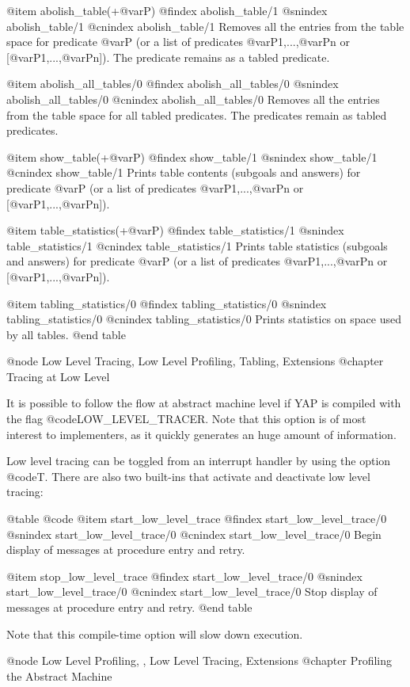 {{{{{{{{@item abolish_table(+@var{P})
@findex abolish_table/1
@snindex abolish_table/1
@cnindex abolish_table/1
Removes all the entries from the table space for predicate @var{P} (or
a list of predicates @var{P1},...,@var{Pn} or
[@var{P1},...,@var{Pn}]). The predicate remains as a tabled predicate.

@item abolish_all_tables/0
@findex abolish_all_tables/0
@snindex abolish_all_tables/0
@cnindex abolish_all_tables/0
Removes all the entries from the table space for all tabled
predicates. The predicates remain as tabled predicates.

@item show_table(+@var{P})
@findex show_table/1
@snindex show_table/1
@cnindex show_table/1
Prints table contents (subgoals and answers) for predicate @var{P}
(or a list of predicates @var{P1},...,@var{Pn} or
[@var{P1},...,@var{Pn}]).

@item table_statistics(+@var{P})
@findex table_statistics/1
@snindex table_statistics/1
@cnindex table_statistics/1
Prints table statistics (subgoals and answers) for predicate @var{P}
(or a list of predicates @var{P1},...,@var{Pn} or
[@var{P1},...,@var{Pn}]).

@item tabling_statistics/0
@findex tabling_statistics/0
@snindex tabling_statistics/0
@cnindex tabling_statistics/0
Prints statistics on space used by all tables.
@end table


@node Low Level Tracing, Low Level Profiling, Tabling, Extensions
@chapter Tracing at Low Level

It is possible to follow the flow at abstract machine level if
YAP is compiled with the flag @code{LOW_LEVEL_TRACER}. Note
that this option is of most interest to implementers, as it quickly generates
an huge amount of information.

Low level tracing can be toggled from an interrupt handler by using the
option @code{T}. There are also two built-ins that activate and
deactivate low level tracing:

@table @code
@item start_low_level_trace
@findex start_low_level_trace/0
@snindex start_low_level_trace/0
@cnindex start_low_level_trace/0
Begin display of messages at procedure entry and retry.

@item stop_low_level_trace
@findex start_low_level_trace/0
@snindex start_low_level_trace/0
@cnindex start_low_level_trace/0
Stop display of messages at procedure entry and retry.
@end table

Note that this compile-time option will slow down execution.

@node Low Level Profiling, , Low Level Tracing, Extensions
@chapter Profiling the Abstract Machine

}}}}}}}}
